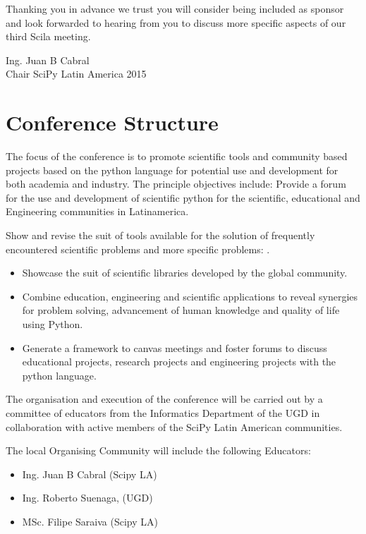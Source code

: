 \documentclass[11pt,a4paper]{report}
\begin{document}
Thanking you in advance we trust you will consider being included as
sponsor and look forwarded to hearing from you to discuss more
specific aspects of our third Scila meeting.\\[0.2cm]

\begin{flushright}
Ing. Juan B Cabral\\
Chair SciPy Latin America 2015 \\

\end{flushright}
\newpage
\section*{Conference Structure}

    The focus of the conference is to promote scientific tools
    and community based projects based on the python
    language for potential use and development for both academia and
industry. The principle
    objectives include: Provide a forum for the use and development of
    scientific python for the scientific, educational and Engineering
    communities in Latinamerica.

    Show and revise the suit of tools available for the solution of
    frequently encountered scientific problems and more specific
    problems:
.
  \begin{itemize}
    \item Showcase the suit of scientific libraries developed by the
global community.
    \item Combine education, engineering and scientific applications to reveal
    synergies for problem solving, advancement of human knowledge
    and quality of life using Python.
    \item Generate a framework to canvas meetings and foster forums
    to discuss educational projects, research projects and engineering
    projects with the python language.
  \end{itemize}

The organisation and execution of the conference will be carried out
by a committee of educators from the Informatics Department of the UGD
in collaboration with active members of the SciPy Latin American
communities.

The local Organising Community will include the following Educators:\\
\begin{itemize}[nolistsep]
    \item Ing. Juan B Cabral (Scipy LA)
    \item Ing. Roberto Suenaga, (UGD)
    \item MSc. Filipe Saraiva (Scipy LA)
\end{itemize}
\end{document}
